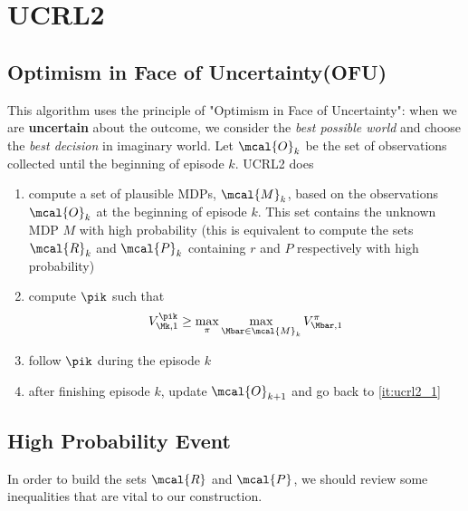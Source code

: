     \section{UCRL2}
    \label{sec:ucrl2}
    
        \subsection{Optimism in Face of Uncertainty(OFU)}
        \label{subsec:OFU}
        
        This algorithm uses the principle of "Optimism in Face of Uncertainty": when we are \textbf{uncertain} about the outcome, we consider the \textit{best possible world} and choose the \textit{best decision} in imaginary world. Let $\mcal{O}_k$ be the set of observations collected until the beginning of episode $k$. UCRL2 does
            \begin{enumerate}
                \item \label{it:ucrl2_1} compute a set of plausible MDPs, $\mcal{M}_k$, based on the observations $\mcal{O}_k$ at the beginning of episode $k$. This set contains the unknown MDP $M$ with high probability (this is equivalent to compute the sets $\mcal{R}_k$ and $\mcal{P}_k$ containing $r$ and $P$ respectively with high probability)
                \item compute $\pik$ such that
                    \begin{align}
                        V_{\Mk,1}^{\pik} \ge \max_{\pi}\max_{\Mbar\in\mcal{M}_k} V_{\Mbar,1}^\pi
                    \end{align}
                \item follow $\pik$ during the episode $k$
                \item after finishing episode $k$, update $\mcal{O}_{k+1}$ and go back to \ref{it:ucrl2_1}
            \end{enumerate}
        
        \subsection{High Probability Event}
        \label{subsec:high_prob_event}
            In order to build the sets $\mcal{R}$ and $\mcal{P}$, we should review some inequalities that are vital to our construction.
        
